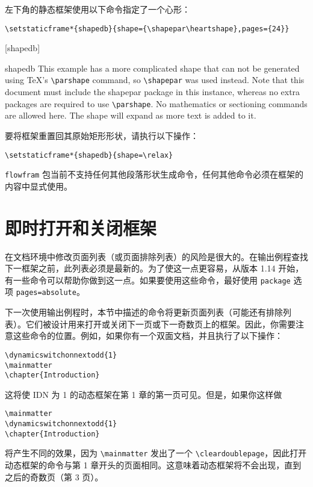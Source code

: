 \documentclass[a4paper]{book}%
\newcommand{\sty}[1]{\texttt{#1}}
\newcommand{\cmd}[1]{\texttt{#1}}
\begin{document}
左下角的静态框架使用以下命令指定了一个心形：
\begin{mdframed}[backgroundcolor=white]
    \verb|\setstaticframe*{shapedb}{shape={\shapepar\heartshape},pages={24}}|
\end{mdframed}
[shapedb]
\begin{staticcontents*}{shapedb}
    This example has a more complicated shape that can not be generated using \TeX{}'s \cmd{\textbackslash{parshape}} command, so \cmd{\textbackslash{shapepar}} was used instead. Note that this document must include the shapepar package in this instance, whereas no extra packages are required to use \cmd{\textbackslash{parshape}}. No mathematics or sectioning commands are allowed here. The shape will expand as more text is added to it.
\end{staticcontents*}
要将框架重置回其原始矩形形状，请执行以下操作：
\begin{mdframed}[backgroundcolor=white]
    \verb|\setstaticframe*{shapedb}{shape=\relax}|
\end{mdframed}

\sty{flowfram} 包当前不支持任何其他段落形状生成命令，任何其他命令必须在框架的内容中显式使用。
\section{即时打开和关闭框架}\label{sec-3-2}%
在文档环境中修改页面列表（或页面排除列表）的风险是很大的。在输出例程查找下一框架之前，此列表必须是最新的。为了使这一点更容易，从版本 1.14 开始，有一些命令可以帮助你做到这一点。如果要使用这些命令，最好使用 \sty{package} 选项 \cmd{pages=absolute}。

下一次使用输出例程时，本节中描述的命令将更新页面列表（可能还有排除列表）。它们被设计用来打开或关闭下一页或下一奇数页上的框架。因此，你需要注意这些命令的位置。例如，如果你有一个双面文档，并且执行了以下操作：
\begin{lstlisting}[backgroundcolor=\color{white}]
\dynamicswitchonnextodd{1}
\mainmatter
\chapter{Introduction}
\end{lstlisting}
这将使 IDN 为 1 的动态框架在第 1 章的第一页可见。但是，如果你这样做
\begin{lstlisting}[backgroundcolor=\color{white}]
\mainmatter
\dynamicswitchonnextodd{1}
\chapter{Introduction}
\end{lstlisting}
将产生不同的效果，因为 \verb|\mainmatter| 发出了一个 \verb|\cleardoublepage|，因此打开动态框架的命令与第 1 章开头的页面相同。这意味着动态框架将不会出现，直到之后的奇数页（第 3 页）。
\end{document}
